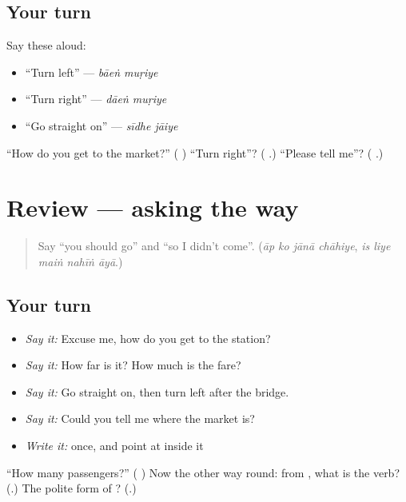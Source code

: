\subsection*{Your turn}
Say these aloud:

\begin{itemize}
\raggedright
  \item \textquotedblleft{}Turn left\textquotedblright{} — \emph{bāeṅ muṛiye}
  \item \textquotedblleft{}Turn right\textquotedblright{} — \emph{dāeṅ muṛiye}
  \item \textquotedblleft{}Go straight on\textquotedblright{} — \emph{sīdhe jāiye}
\end{itemize}

\begin{tcolorbox}[breakable,colback=teal!4,colframe=teal!35!black,title={Before you move on}]
\textquotedblleft{}How do you get to the market?\textquotedblright{} (\textbf{   }) \textquotedblleft{}Turn right\textquotedblright{}? (\textbf{ }.) \textquotedblleft{}Please tell me\textquotedblright{}? (\textbf{ }.)
\end{tcolorbox}
\section[(review)]{Review — asking the way}

\label{lesson:UR-R270-asking-the-way}



\begin{quote}
Say \textquotedblleft{}you should go\textquotedblright{} and \textquotedblleft{}so I didn't come\textquotedblright{}. (\emph{āp ko jānā chāhiye}, \emph{is liye maiṅ nahīṅ āyā}.)
\end{quote}

\subsection*{Your turn}
\begin{itemize}
\raggedright
  \item \emph{Say it:} Excuse me, how do you get to the station?
  \item \emph{Say it:} How far is it? How much is the fare?
  \item \emph{Say it:} Go straight on, then turn left after the bridge.
  \item \emph{Say it:} Could you tell me where the market is?
  \item \emph{Write it:} \textbf{} once, and point at  inside it
\end{itemize}

\begin{tcolorbox}[breakable,colback=teal!4,colframe=teal!35!black,title={Before you move on}]
\textquotedblleft{}How many passengers?\textquotedblright{} (\textbf{ }) Now the other way round: from \textbf{}, what is the verb? (\textbf{}.) The polite form of \textbf{}? (\textbf{}.)
\end{tcolorbox}
